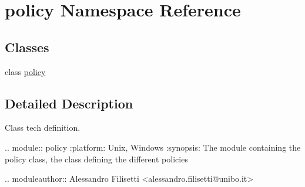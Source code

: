 \hypertarget{namespacepolicy}{\section{policy Namespace Reference}
\label{namespacepolicy}
}
\subsection*{Classes}
\begin{DoxyCompactItemize}
\item 
class \hyperlink{classpolicy_1_1policy}{policy}
\end{DoxyCompactItemize}


\subsection{Detailed Description}
\begin{DoxyVerb}Class tech definition.

.. module:: policy
   :platform: Unix, Windows
   :synopsis: The module containing the policy class, the class defining the different policies
   
.. moduleauthor:: Alessandro Filisetti <alessandro.filisetti@unibo.it>\end{DoxyVerb}
 